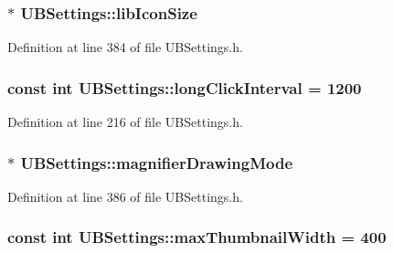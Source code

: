 \hypertarget{class_u_b_settings_a99e641a68f671ef213d2936828d537e2}{
\subsubsection[{lib\-Icon\-Size}]{$\ast$ U\-B\-Settings\-::lib\-Icon\-Size}}\label{db/d66/class_u_b_settings_a99e641a68f671ef213d2936828d537e2}


Definition at line 384 of file U\-B\-Settings.\-h.

\hypertarget{class_u_b_settings_a0549e150ac04cce8f3dc444a435a003b}{
\subsubsection[{long\-Click\-Interval}]{\setlength{\rightskip}{0pt plus 5cm}const int U\-B\-Settings\-::long\-Click\-Interval = 1200\hspace{0.3cm}{\ttfamily [static]}}}\label{db/d66/class_u_b_settings_a0549e150ac04cce8f3dc444a435a003b}


Definition at line 216 of file U\-B\-Settings.\-h.

\hypertarget{class_u_b_settings_a82c958efcb6a1f1e49062fb06aaf388d}{
\subsubsection[{magnifier\-Drawing\-Mode}]{$\ast$ U\-B\-Settings\-::magnifier\-Drawing\-Mode}}\label{db/d66/class_u_b_settings_a82c958efcb6a1f1e49062fb06aaf388d}


Definition at line 386 of file U\-B\-Settings.\-h.

\hypertarget{class_u_b_settings_a7baff769a2e029fd39bebab986daf29f}{
\subsubsection[{max\-Thumbnail\-Width}]{\setlength{\rightskip}{0pt plus 5cm}const int U\-B\-Settings\-::max\-Thumbnail\-Width = 400\hspace{0.3cm}{\ttfamily [static]}}}\label{db/d66/class_u_b_settings_a7baff769a2e029fd39bebab986daf29f}


